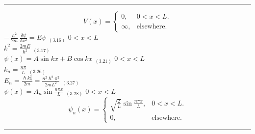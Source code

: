 \documentclass[0pt]{report}
\begin{document}
\begin{multicols}{3}
\begin{flushleft}
\noindent\rule[0.5ex]{\linewidth}{.25pt}
\begin{equation*}
  V(x)=\begin{cases}
    0, & \text{$0<x<L$}.\\
    \infty, & \text{elsewhere}.
  \end{cases}
\end{equation*}
$-\frac{\hslash^2}{2m}\frac{\delta\psi}{\delta x^2}=E\psi$ $_{(3.16)}$ $0<x<L$\\
$k^2=\frac{2mE}{\hslash^2}$ $_{(3.17)}$\\
$\psi(x)=A\sin kx+B\cos kx$ $_{(3.21)}$ $0<x<L$\\
$k_n=\frac{n\pi}{L}$ $_{(3.26)}$\\
$E_n=\frac{\hslash k_n^2}{2m}=\frac{n^2\hslash^2\pi^2}{2mL^2}$ $_{(3.27)}$\\
$\psi(x)=A_n\sin\frac{n\pi x}{L}$ $_{(3.28)}$ $0<x<L$\\
\begin{equation*}
  \psi_n(x)=\begin{cases}
    \sqrt{\frac{2}{L}}\sin\frac{n\pi x}{L}, & \text{$0<x<L$}.\\
    0, & \text{elsewhere}.
  \end{cases}
\end{equation*}
\noindent\rule[0.5ex]{\linewidth}{.25pt}


\end{flushleft}
\end{multicols}
\end{document}
